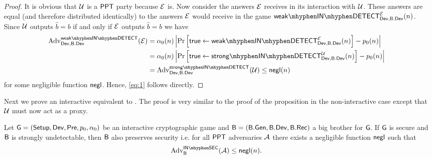 \begin{proof}
It is obvious that $\mathcal{U}$ is a $\mathsf{PPT}$ party because $\mathcal{E}$ is. Now consider the answers $\mathcal{E}$ receives in its interaction with $\mathcal{U}$. These answers are equal (and therefore distributed identically) to the answers $\mathcal{E}$ would receive in the game $\inweakdetect{\dev}{\bbdev}{\eve}$. Since $\mathcal{U}$ outputs $\hat{b} = b$ if and only if $\mathcal{E}$ outputs $\hat{b} = b$ we have
\begin{align*}
\adv_{\dev,\bbdev}^{\inweakdetectplain}(\eve) &= \secf(n)\left\vert \prob{\true\leftarrow \inweakdetect{\dev}{\bbdev}{\eve}}-\basep(n)\right\vert \\
	& = \secf(n)\left\vert \prob{\true\leftarrow \instrongdetect{\dev}{\bbdev}{\user}}-\basep(n)\right\vert \\
	& = \adv_{\dev,\bbdev}^{\instrongdetectplain}(\user) \leq \negl(n)
\end{align*}
for some negligible function $\operatorname{\mathsf{negl}}$. Hence, \ref{eq:1} follows directly.
\end{proof}

Next we prove an interactive equivalent to . The proof is very similar to the proof of the proposition in the non-interactive case except that $\mathcal{U}$ must now act as a proxy.

\begin{prop}
Let $\operatorname{\mathsf{G}}=\left(\operatorname{\mathsf{Setup}},\operatorname{\mathsf{Dev}},\operatorname{\mathsf{Pre}},p_{0},\alpha_{0}\right)$ be an interactive cryptographic game and $\mathsf{B} = \left(\mathsf{B}.\mathsf{Gen},\mathsf{B}.\mathsf{Dev},\mathsf{B}.\mathsf{Rec}\right)$ a big brother for $\operatorname{\mathsf{G}}$. If $\operatorname{\mathsf{G}}$ is secure and $\mathsf{B}$ is strongly undetectable, then $\mathsf{B}$ also preserves security i.e. for all $\mathsf{PPT}$ adversaries $\mathcal{A}$ there exists a negligible function $\operatorname{\mathsf{negl}}$ such that
\begin{align*}
	\adv_{\bb}^{\insecgame}(\adve) \leq \negl(n).
\end{align*}
\end{prop}

